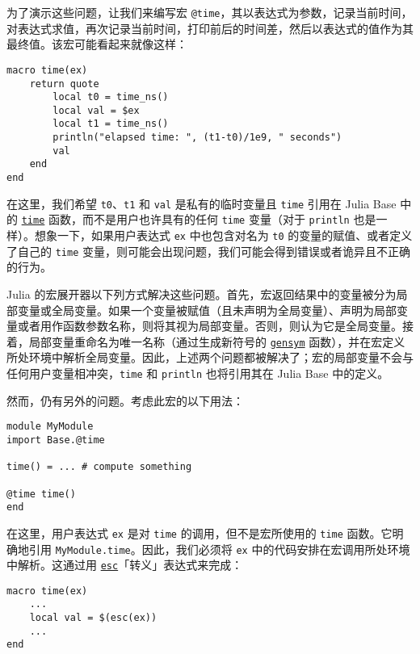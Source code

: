 为了演示这些问题，让我们来编写宏 \texttt{@time}，其以表达式为参数，记录当前时间，对表达式求值，再次记录当前时间，打印前后的时间差，然后以表达式的值作为其最终值。该宏可能看起来就像这样：




\begin{verbatim}
macro time(ex)
    return quote
        local t0 = time_ns()
        local val = $ex
        local t1 = time_ns()
        println("elapsed time: ", (t1-t0)/1e9, " seconds")
        val
    end
end
\end{verbatim}



在这里，我们希望 \texttt{t0}、\texttt{t1} 和 \texttt{val} 是私有的临时变量且 \texttt{time} 引用在 Julia Base 中的 \hyperlink{2441622941271736623}{\texttt{time}} 函数，而不是用户也许具有的任何 \texttt{time} 变量（对于 \texttt{println} 也是一样）。想象一下，如果用户表达式 \texttt{ex} 中也包含对名为 \texttt{t0} 的变量的赋值、或者定义了自己的 \texttt{time} 变量，则可能会出现问题，我们可能会得到错误或者诡异且不正确的行为。



Julia 的宏展开器以下列方式解决这些问题。首先，宏返回结果中的变量被分为局部变量或全局变量。如果一个变量被赋值（且未声明为全局变量）、声明为局部变量或者用作函数参数名称，则将其视为局部变量。否则，则认为它是全局变量。接着，局部变量重命名为唯一名称（通过生成新符号的 \hyperlink{3515345868651201289}{\texttt{gensym}} 函数），并在宏定义所处环境中解析全局变量。因此，上述两个问题都被解决了；宏的局部变量不会与任何用户变量相冲突，\texttt{time} 和 \texttt{println} 也将引用其在 Julia Base 中的定义。



然而，仍有另外的问题。考虑此宏的以下用法：




\begin{verbatim}
module MyModule
import Base.@time

time() = ... # compute something

@time time()
end
\end{verbatim}



在这里，用户表达式 \texttt{ex} 是对 \texttt{time} 的调用，但不是宏所使用的 \texttt{time} 函数。它明确地引用 \texttt{MyModule.time}。因此，我们必须将 \texttt{ex} 中的代码安排在宏调用所处环境中解析。这通过用 \hyperlink{17861659594346526773}{\texttt{esc}}「转义」表达式来完成：




\begin{verbatim}
macro time(ex)
    ...
    local val = $(esc(ex))
    ...
end
\end{verbatim}



